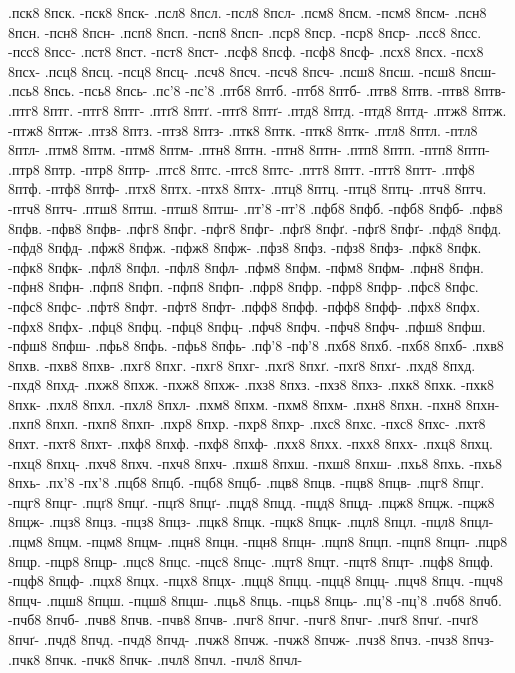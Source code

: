 {.пск8 8пск. -пск8 8пск-
.псл8 8псл. -псл8 8псл-
.псм8 8псм. -псм8 8псм-
.псн8 8псн. -псн8 8псн-
.псп8 8псп. -псп8 8псп-
.пср8 8пср. -пср8 8пср-
.псс8 8псс. -псс8 8псс-
.пст8 8пст. -пст8 8пст-
.псф8 8псф. -псф8 8псф-
.псх8 8псх. -псх8 8псх-
.псц8 8псц. -псц8 8псц-
.псч8 8псч. -псч8 8псч-
.псш8 8псш. -псш8 8псш-
.псь8 8псь. -псь8 8псь-
.пс'8 -пс'8
.птб8 8птб. -птб8 8птб-
.птв8 8птв. -птв8 8птв-
.птг8 8птг. -птг8 8птг-
.птґ8 8птґ. -птґ8 8птґ-
.птд8 8птд. -птд8 8птд-
.птж8 8птж. -птж8 8птж-
.птз8 8птз. -птз8 8птз-
.птк8 8птк. -птк8 8птк-
.птл8 8птл. -птл8 8птл-
.птм8 8птм. -птм8 8птм-
.птн8 8птн. -птн8 8птн-
.птп8 8птп. -птп8 8птп-
.птр8 8птр. -птр8 8птр-
.птс8 8птс. -птс8 8птс-
.птт8 8птт. -птт8 8птт-
.птф8 8птф. -птф8 8птф-
.птх8 8птх. -птх8 8птх-
.птц8 8птц. -птц8 8птц-
.птч8 8птч. -птч8 8птч-
.птш8 8птш. -птш8 8птш-
.пт'8 -пт'8
.пфб8 8пфб. -пфб8 8пфб-
.пфв8 8пфв. -пфв8 8пфв-
.пфг8 8пфг. -пфг8 8пфг-
.пфґ8 8пфґ. -пфґ8 8пфґ-
.пфд8 8пфд. -пфд8 8пфд-
.пфж8 8пфж. -пфж8 8пфж-
.пфз8 8пфз. -пфз8 8пфз-
.пфк8 8пфк. -пфк8 8пфк-
.пфл8 8пфл. -пфл8 8пфл-
.пфм8 8пфм. -пфм8 8пфм-
.пфн8 8пфн. -пфн8 8пфн-
.пфп8 8пфп. -пфп8 8пфп-
.пфр8 8пфр. -пфр8 8пфр-
.пфс8 8пфс. -пфс8 8пфс-
.пфт8 8пфт. -пфт8 8пфт-
.пфф8 8пфф. -пфф8 8пфф-
.пфх8 8пфх. -пфх8 8пфх-
.пфц8 8пфц. -пфц8 8пфц-
.пфч8 8пфч. -пфч8 8пфч-
.пфш8 8пфш. -пфш8 8пфш-
.пфь8 8пфь. -пфь8 8пфь-
.пф'8 -пф'8
.пхб8 8пхб. -пхб8 8пхб-
.пхв8 8пхв. -пхв8 8пхв-
.пхг8 8пхг. -пхг8 8пхг-
.пхґ8 8пхґ. -пхґ8 8пхґ-
.пхд8 8пхд. -пхд8 8пхд-
.пхж8 8пхж. -пхж8 8пхж-
.пхз8 8пхз. -пхз8 8пхз-
.пхк8 8пхк. -пхк8 8пхк-
.пхл8 8пхл. -пхл8 8пхл-
.пхм8 8пхм. -пхм8 8пхм-
.пхн8 8пхн. -пхн8 8пхн-
.пхп8 8пхп. -пхп8 8пхп-
.пхр8 8пхр. -пхр8 8пхр-
.пхс8 8пхс. -пхс8 8пхс-
.пхт8 8пхт. -пхт8 8пхт-
.пхф8 8пхф. -пхф8 8пхф-
.пхх8 8пхх. -пхх8 8пхх-
.пхц8 8пхц. -пхц8 8пхц-
.пхч8 8пхч. -пхч8 8пхч-
.пхш8 8пхш. -пхш8 8пхш-
.пхь8 8пхь. -пхь8 8пхь-
.пх'8 -пх'8
.пцб8 8пцб. -пцб8 8пцб-
.пцв8 8пцв. -пцв8 8пцв-
.пцг8 8пцг. -пцг8 8пцг-
.пцґ8 8пцґ. -пцґ8 8пцґ-
.пцд8 8пцд. -пцд8 8пцд-
.пцж8 8пцж. -пцж8 8пцж-
.пцз8 8пцз. -пцз8 8пцз-
.пцк8 8пцк. -пцк8 8пцк-
.пцл8 8пцл. -пцл8 8пцл-
.пцм8 8пцм. -пцм8 8пцм-
.пцн8 8пцн. -пцн8 8пцн-
.пцп8 8пцп. -пцп8 8пцп-
.пцр8 8пцр. -пцр8 8пцр-
.пцс8 8пцс. -пцс8 8пцс-
.пцт8 8пцт. -пцт8 8пцт-
.пцф8 8пцф. -пцф8 8пцф-
.пцх8 8пцх. -пцх8 8пцх-
.пцц8 8пцц. -пцц8 8пцц-
.пцч8 8пцч. -пцч8 8пцч-
.пцш8 8пцш. -пцш8 8пцш-
.пць8 8пць. -пць8 8пць-
.пц'8 -пц'8
.пчб8 8пчб. -пчб8 8пчб-
.пчв8 8пчв. -пчв8 8пчв-
.пчг8 8пчг. -пчг8 8пчг-
.пчґ8 8пчґ. -пчґ8 8пчґ-
.пчд8 8пчд. -пчд8 8пчд-
.пчж8 8пчж. -пчж8 8пчж-
.пчз8 8пчз. -пчз8 8пчз-
.пчк8 8пчк. -пчк8 8пчк-
.пчл8 8пчл. -пчл8 8пчл-
}
